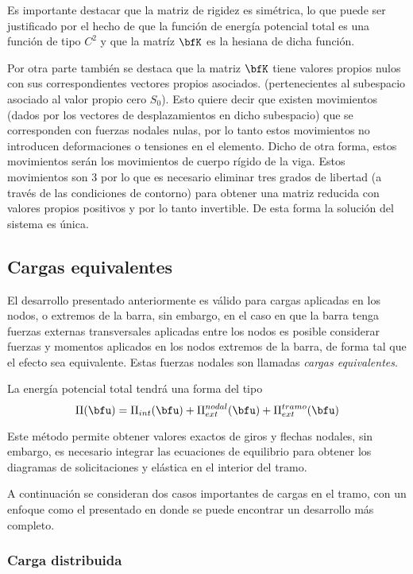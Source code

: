 Es importante destacar que la matriz de rigidez es simétrica, lo que puede ser justificado por el hecho de que la función de energía potencial total es una función de tipo $C^2$ y que la matríz $\bfK$ es la hesiana  de dicha función. %

Por otra parte también se destaca que la matriz $\bfK$ tiene valores propios nulos con sus correspondientes vectores propios asociados. %
(pertenecientes al subespacio asociado al valor propio cero $S_0$). %
%
Esto quiere decir que existen movimientos (dados por los vectores de desplazamientos en dicho subespacio) que se corresponden con fuerzas nodales nulas, por lo tanto estos movimientos no introducen deformaciones o tensiones en el elemento. %
%
Dicho de otra forma, estos movimientos serán los movimientos de cuerpo rígido de la viga. %
%
Estos movimientos son 3 por lo que es necesario eliminar tres grados de libertad (a través de las condiciones de contorno) para obtener una matriz reducida con valores propios positivos y por lo tanto invertible. %
%
De esta forma la solución del sistema es única.






\subsection{Cargas equivalentes} \label{sec:cargequiv}

El desarrollo presentado anteriormente es válido para cargas aplicadas en los nodos, o extremos de la barra, sin embargo, en el caso en que la barra tenga fuerzas externas transversales aplicadas entre los nodos es posible considerar fuerzas y momentos aplicados en los nodos extremos de la barra, de forma tal que el efecto sea equivalente. %
%
Estas fuerzas nodales son llamadas \textit{cargas equivalentes}. %

La energía potencial total tendrá una forma del tipo
$$
\Pi(\bfu) = \Pi_{int}(\bfu) + \Pi_{ext}^{nodal}(\bfu) + \Pi_{ext}^{tramo}(\bfu)
$$

Este método permite obtener valores exactos de giros y flechas nodales, sin embargo, es necesario integrar las ecuaciones de equilibrio para obtener los diagramas de solicitaciones  y elástica en el  interior del tramo.

A continuación se consideran dos casos importantes de cargas en el tramo, con un enfoque como el presentado en \citep{Onate2013} donde se puede encontrar un desarrollo más completo. %

\subsubsection{Carga distribuida}

